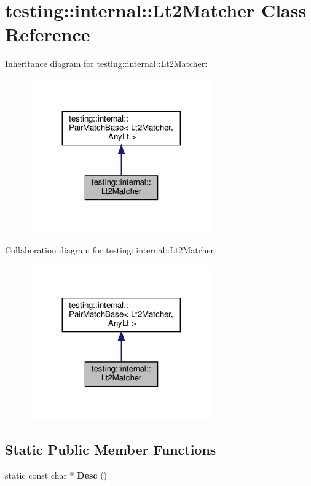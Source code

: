\hypertarget{classtesting_1_1internal_1_1_lt2_matcher}{}\section{testing\+:\+:internal\+:\+:Lt2\+Matcher Class Reference}
\label{classtesting_1_1internal_1_1_lt2_matcher}


Inheritance diagram for testing\+:\+:internal\+:\+:Lt2\+Matcher\+:
\nopagebreak
\begin{figure}[H]
\begin{center}
\leavevmode
\includegraphics[width=224pt]{classtesting_1_1internal_1_1_lt2_matcher__inherit__graph}
\end{center}
\end{figure}


Collaboration diagram for testing\+:\+:internal\+:\+:Lt2\+Matcher\+:
\nopagebreak
\begin{figure}[H]
\begin{center}
\leavevmode
\includegraphics[width=224pt]{classtesting_1_1internal_1_1_lt2_matcher__coll__graph}
\end{center}
\end{figure}
\subsection*{Static Public Member Functions}
\begin{DoxyCompactItemize}
\item 
\mbox{\label{classtesting_1_1internal_1_1_lt2_matcher_ae5d3129050392105e21755f39b933b09}} 
static const char $\ast$ {\bfseries Desc} ()
\end{DoxyCompactItemize}
